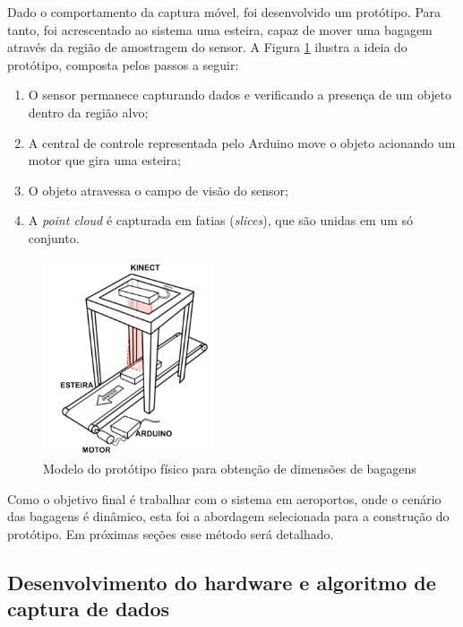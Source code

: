     Dado o comportamento da captura móvel, foi desenvolvido um protótipo.  Para tanto, foi acrescentado ao sistema uma esteira, capaz de mover uma bagagem através da região de amostragem do sensor. A Figura \ref{fig:ModeloPrototipoFisico} ilustra a ideia do protótipo, composta pelos passos a seguir:
    
    \begin{enumerate}
        \item O sensor permanece capturando dados e verificando a presença de um objeto dentro da região alvo;
        \item A central de controle representada pelo Arduino move o objeto acionando um motor que gira uma esteira;
        \item O objeto atravessa o campo de visão do sensor;
        \item A \textit{point cloud} é capturada em fatias (\textit{slices}), que são unidas em um só conjunto.
    \end{enumerate}


        \begin{figure}[h]
           \centering
           \includegraphics[width=0.45\textwidth]{imagens/ModeloPrototipoFisico.png}
           \caption{Modelo do protótipo físico para obtenção de dimensões de bagagens}
          \label{fig:ModeloPrototipoFisico}
        \end{figure}
    
    Como o objetivo final é trabalhar com o sistema em aeroportos, onde o cenário das bagagens é dinâmico, esta foi a abordagem selecionada para a construção do protótipo. Em próximas seções esse método será detalhado.
    

\subsection{Desenvolvimento do hardware e algoritmo de captura de dados}
\label{subsubsec_Desenvolvimento do hardware do protótipo}


